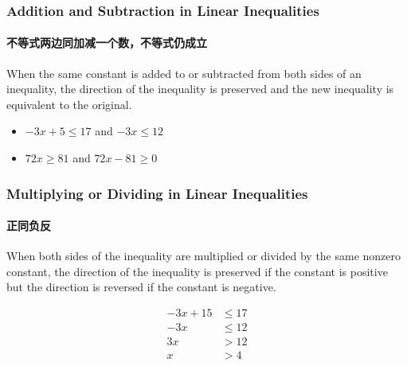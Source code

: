 \documentclass[
	11pt, %
]{beamer}
\begin{document}

\begin{frame}
	\frametitle{Addition and Subtraction in  Linear Inequalities}
	\framesubtitle{不等式两边同加减一个数，不等式仍成立}

	\begin{theorem}[Rule 1]
		When the same constant is added to or subtracted from both sides of an inequality, the direction of the inequality is preserved and the new inequality is equivalent to the original.
	\end{theorem}

	\begin{example}
		\begin{itemize}
			\item   $-3x +5 \leq 17 $ and $-3x \leq 12$
			\item   $72x  \geq 81 $ and $72x  -81 \geq 0 $
		\end{itemize}
	\end{example}

\end{frame}




\begin{frame}
	\frametitle{Multiplying or Dividing in  Linear Inequalities}
	\framesubtitle{正同负反}
	\begin{theorem}[Rule 2]
		When both sides of the inequality are multiplied or divided by the same nonzero constant, the direction of the inequality is \alert{preserved if the constant is positive} but the direction is \alert{reversed if the constant is negative}.
	\end{theorem}

	\begin{example}
	  \begin{equation*}
	  	\begin{split}
	  		-3x + 15 &\leq 17\\
	  		-3x &\leq 12 \\
	  		3x &>12 \\
	  		x &> 4\\
	  	\end{split}
	  \end{equation*}
	\end{example}

\end{frame}

\end{document}
